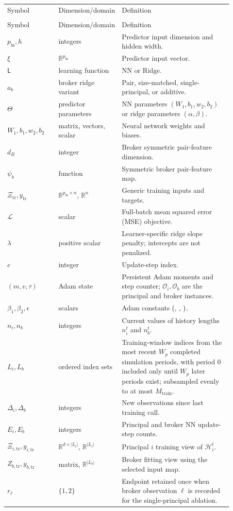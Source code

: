 \documentclass[11pt]{article}
\makeatletter
\newcommand{\R}{\mathbb{R}}
\newenvironment{localvartable}[1]{%
\begingroup
\small
\setlength{\tabcolsep}{4pt}
\renewcommand{\arraystretch}{1.08}
\begin{longtable}{>{\raggedright\arraybackslash}p{0.23\linewidth}
                >{\raggedright\arraybackslash}p{0.18\linewidth}
                >{\raggedright\arraybackslash}p{0.51\linewidth}}
\toprule
\multicolumn{3}{@{}l}{\textit{Local variables for #1}}\\
\midrule
Symbol & Dimension/domain & Definition \\
\midrule
\endfirsthead
\toprule
\multicolumn{3}{@{}l}{\textit{Local variables for #1 (continued)}}\\
\midrule
Symbol & Dimension/domain & Definition \\
\midrule
\endhead
}{%
\bottomrule
\end{longtable}
\endgroup
}
\makeatother
\begin{document}
\begin{localvartable}{training}
$p_{\mathrm{in}},h$ & integers & Predictor input dimension and hidden width. \\
$\xi$ & $\R^{p_{\mathrm{in}}}$ & Predictor input vector. \\
$\mathsf L$ & learning function & $\mathrm{NN}$ or $\mathrm{Ridge}$. \\
$a_b$ & broker ridge variant & Pair, size-matched, single-principal, or additive. \\
$\Theta$ & predictor parameters & NN parameters $(W_1,b_1,w_2,b_2)$ or ridge parameters $(\alpha,\beta)$. \\
$W_1,b_1,w_2,b_2$ & matrix, vectors, scalar & Neural network weights and biases. \\
$d_B$ & integer & Broker symmetric pair-feature dimension. \\
$\psi_b$ & function & Symmetric broker pair-feature map. \\
$\Xi_{\mathrm{tr}},y_{\mathrm{tr}}$ & $\R^{p_{\mathrm{in}}\times n}$, $\R^n$ & Generic training inputs and targets. \\
$\mathcal L$ & scalar & Full-batch mean squared error (MSE) objective. \\
$\lambda$ & positive scalar & Learner-specific ridge slope penalty; intercepts are not penalized. \\
$e$ & integer & Update-step index. \\
$(m,v,\tau)$ & Adam state & Persistent Adam moments and step counter; $\mathcal O_i,\mathcal O_b$ are the principal and broker instances. \\
$\beta_1,\beta_2,\epsilon$ & scalars & Adam constants $(\pv{settingAdamBetaOne},\,\pv{settingAdamBetaTwo},\,\pv{settingAdamEpsilon})$. \\
$n_i,n_b$ & integers & Current values of history lengths $n_i^t$ and $n_b^t$. \\
$L_i,L_b$ & ordered index sets & Training-window indices from the most recent $W_p$ completed simulation periods, with period 0 included only until $W_p$ later periods exist; subsampled evenly to at most $M_{\text{train}}$. \\
$\Delta_i,\Delta_b$ & integers & New observations since last training call. \\
$E_i,E_b$ & integers & Principal and broker NN update-step counts. \\
$\Xi_{i,\mathrm{tr}},y_{i,\mathrm{tr}}$ & $\R^{d\times |L_i|}$, $\R^{|L_i|}$ & Principal $i$ training view of $\mathcal H_i^t$. \\
$Z_{b,\mathrm{tr}},y_{b,\mathrm{tr}}$ & matrix, $\R^{|L_b|}$ & Broker fitting view using the selected input map. \\
$r_\ell$ & $\{1,2\}$ & Endpoint retained once when broker observation $\ell$ is recorded for the single-principal ablation. \\
\end{localvartable}
\end{document}
